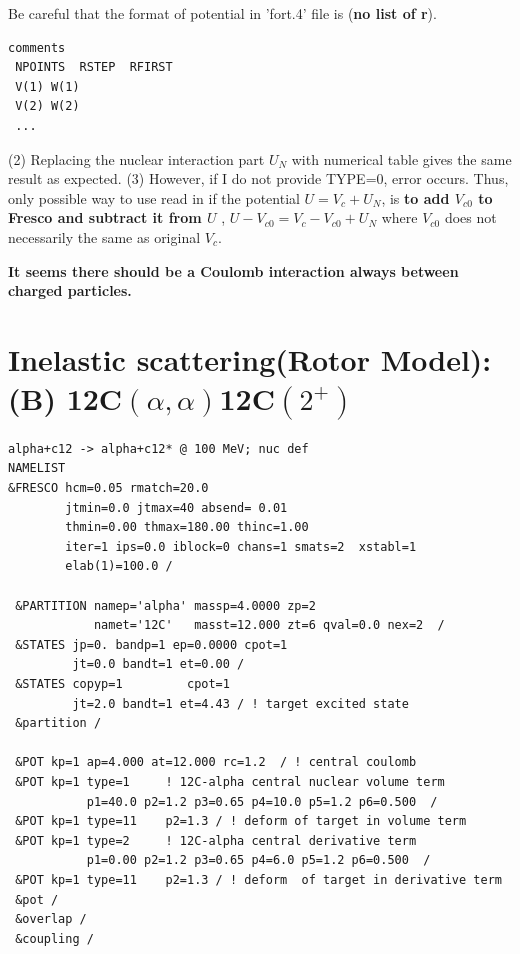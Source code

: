 \documentclass[11pt]{book}
\begin{document}
Be careful that the format of potential in 'fort.4' file is ({\bf no list of r}).
\begin{small} \begin{lstlisting}[frame=single]
 comments
 NPOINTS  RSTEP  RFIRST
 V(1) W(1)
 V(2) W(2) 
 ...   
\end{lstlisting} \end{small}
(2) Replacing the nuclear interaction part $U_N$ with numerical table 
    gives the same result as expected. 
(3) However, if I do not provide TYPE=0, error occurs. Thus, only possible way to use
read in if the potential $U=V_c+U_N$, is {\bf to add $V_{c0}$ to Fresco and 
	subtract it from $U$} ,
$U-V_{c0} = V_c-V_{c0}+U_N$ where $V_{c0}$ does not necessarily the same as original $V_c$.  

{\bf It seems there should be a Coulomb interaction always between charged particles.} 


\section{Inelastic scattering(Rotor Model): (B) 12C$(\alpha,\alpha)$12C$(2^+)$ } 
\begin{small} 
\begin{lstlisting}[frame=single]
alpha+c12 -> alpha+c12* @ 100 MeV; nuc def
NAMELIST
&FRESCO hcm=0.05 rmatch=20.0
        jtmin=0.0 jtmax=40 absend= 0.01    
        thmin=0.00 thmax=180.00 thinc=1.00
        iter=1 ips=0.0 iblock=0 chans=1 smats=2  xstabl=1
        elab(1)=100.0 /

 &PARTITION namep='alpha' massp=4.0000 zp=2
            namet='12C'   masst=12.000 zt=6 qval=0.0 nex=2  /
 &STATES jp=0. bandp=1 ep=0.0000 cpot=1 
         jt=0.0 bandt=1 et=0.00 /
 &STATES copyp=1 		 cpot=1      
         jt=2.0 bandt=1 et=4.43 / ! target excited state
 &partition /

 &POT kp=1 ap=4.000 at=12.000 rc=1.2  / ! central coulomb
 &POT kp=1 type=1     ! 12C-alpha central nuclear volume term
           p1=40.0 p2=1.2 p3=0.65 p4=10.0 p5=1.2 p6=0.500  /
 &POT kp=1 type=11    p2=1.3 / ! deform of target in volume term
 &POT kp=1 type=2     ! 12C-alpha central derivative term
           p1=0.00 p2=1.2 p3=0.65 p4=6.0 p5=1.2 p6=0.500  /
 &POT kp=1 type=11    p2=1.3 / ! deform  of target in derivative term
 &pot /
 &overlap /
 &coupling /
\end{lstlisting}
\end{small} 
\end{document}
